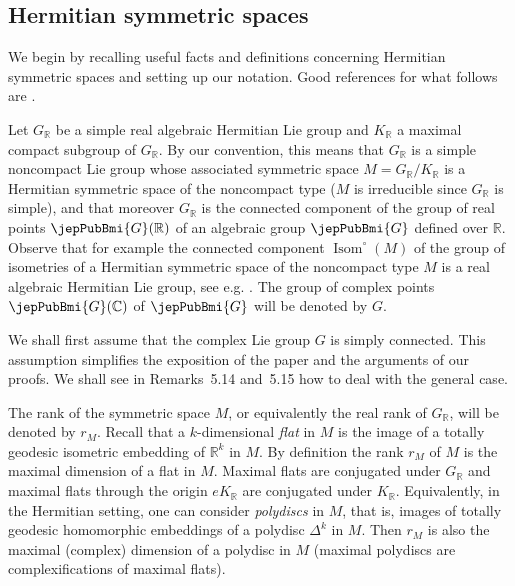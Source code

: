 \subsection{Hermitian symmetric spaces}
We begin by recalling useful facts and definitions concerning Hermitian symmetric spaces and setting up our notation. Good references for what follows are \cite{jep93Wol72,jep93AMRT10,jep93Hel01,jep93Kna02}.

Let $G_{\mathbb R}$ be a simple real algebraic Hermitian Lie group and $K_{\mathbb R}$ a maximal compact subgroup of $G_{\mathbb R}$. By our convention, this means that $G_{\mathbb R}$ is a simple noncompact Lie group whose associated symmetric space $M=G_{\mathbb R}/K_{\mathbb R}$ is a Hermitian symmetric space of the noncompact type ($M$ is irreducible since $G_{\mathbb R}$ is simple), and that moreover $G_{\mathbb R}$ is the connected component of the group of real points $\jepPubBmi{G}(\mathbb R)$ of an algebraic group $\jepPubBmi{G}$ defined over $\mathbb R$. Observe that for example the connected component $\operatorname{Isom}^{\circ}(M)$ of the group of isometries of a Hermitian symmetric space of the noncompact type $M$ is a real algebraic Hermitian Lie group, see e.g. \cite[p.~106]{jep93AMRT10}. The group of complex points $\jepPubBmi{G}(\mathbb C)$ of $\jepPubBmi{G}$ will be denoted by $G$.

We shall first assume that the complex Lie group $G$ is simply connected. This assumption simplifies the exposition of the paper and the arguments of our proofs. We shall see in Remarks~5.14 and~5.15 how to deal with the general case.

The rank of the symmetric space $M$, or equivalently the real rank of $G_{\mathbb R}$, will be denoted by $r_M$. Recall that a $k$-dimensional \emph{flat} in $M$ is the image of a totally geodesic isometric embedding of $\mathbb R^k$ in $M$. By definition the rank $r_M$ of $M$ is the maximal dimension of a flat in $M$. Maximal flats are conjugated under $G_{\mathbb R}$ and maximal flats through the origin $eK_{\mathbb R}$ are conjugated under $K_{\mathbb R}$. Equivalently, in the Hermitian setting, one can consider \emph{polydiscs} in $M$, that is, images of totally geodesic homomorphic embeddings of a polydisc $\Delta^k$ in $M$. Then $r_M$ is also the maximal (complex) dimension of a polydisc in $M$ (maximal polydiscs are complexifications of maximal flats).

